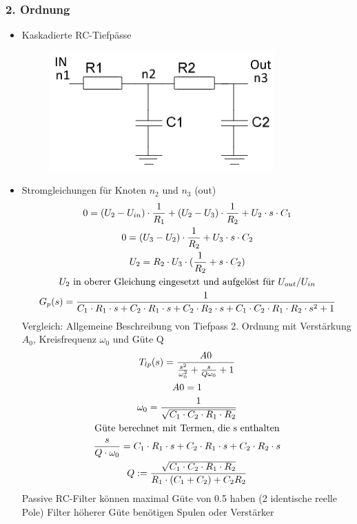 \subsubsection{2. Ordnung}
\begin{itemize}
  \item Kaskadierte RC-Tiefpässe\\
  \begin{figure}[htb]
  \includegraphics[scale=0.4]{pictures/tiefpass2ordnung}
  \end{figure}
  \item Stromgleichungen für Knoten $n_2$ und $n_3$ (out)
  \begin{gather}
  0=(U_2-U_{in})\cdot \frac{1}{R_1}+(U_2-U_3)\cdot \frac{1}{R_2}+U_2\cdot s\cdot C_1\\
  0=(U_3-U_2)\cdot \frac{1}{R_2}+U_3\cdot s\cdot C_2\\
  U_2=R_2\cdot U_3\cdot (\frac{1}{R_2}+s\cdot C_2)\\
  \text{$U_2$ in oberer Gleichung eingesetzt und aufgelöst für
  $U_{out} /U_{in}$}\notag\\
  G_{p}(s)=\frac{1}{C_1\cdot R_1\cdot s+C_2\cdot R_1\cdot s+C_2\cdot R_2\cdot s+C_1\cdot C_2\cdot R_1\cdot R_2\cdot s^2+1}
  \end{gather}
  Vergleich: Allgemeine Beschreibung von Tiefpass 2. Ordnung mit
  Verstärkung $A_0$, Kreisfrequenz $\omega_{0}$ und Güte Q
  \begin{gather}
  T_{lp}(s)=\frac{A0}{\frac{s^2}{\omega_{0}^2}+\frac{s}{Q\omega_{0}}+1}\\
  A0=1\notag\\
  \omega_{0}=\frac{1}{\sqrt{C_1\cdot C_2\cdot R_1\cdot R_2}}\\
  \text{Güte berechnet mit Termen, die s enthalten}\notag\\
  \frac{s}{Q\cdot \omega_{0}}=C_1\cdot R_1\cdot s+C_2\cdot R_1\cdot s+C_2\cdot R_2\cdot s\\
  Q:=\frac{\sqrt{C_1\cdot C_2\cdot R_1\cdot R_2}}{R_1\cdot (C_1+C_2)+C_2R_2}
  \end{gather}
  Passive RC-Filter können maximal Güte von 0.5 haben (2 identische reelle
  Pole) Filter höherer Güte benötigen Spulen oder Verstärker
\end{itemize}
\newpage
